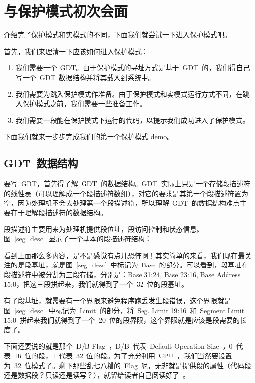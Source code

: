 \section{与保护模式初次会面}

介绍完了保护模式和实模式的不同，下面我们就尝试一下进入保护模式吧。

首先，我们来理清一下应该如何进入保护模式：

\begin{enumerate}
  \item 我们需要一个~GDT。由于保护模式的寻址方式是基于~GDT~的，我们得自己写一个~GDT~数据结构并将其载入到系统中。
  \item 我们需要为跳入保护模式作准备。由于保护模式和实模式运行方式不同，在跳入保护模式之前，我们需要一些准备工作。
  \item 我们需要一段能在保护模式下运行的代码，以提示我们成功进入了保护模式。
\end{enumerate}

下面我们就来一步步完成我们的第一个保护模式 demo。

\subsection{GDT~数据结构}

要写~GDT，首先得了解~GDT~的数据结构。GDT~实际上只是一个存储段描述符的线性表（可以理解成一个段描述符数组），对它的要求是其第一个段描述符置为空，因为处理机不会去处理第一个段描述符，所以理解~GDT~的数据结构难点主要在于理解段描述符的数据结构。

段描述符主要用来为处理机提供段位址，段访问控制和状态信息。图~\ref{seg_desc}~显示了一个基本的段描述符结构：


看到上面那么多内容，是不是感觉有点儿恐怖啊！其实简单的来看，我们现在最关注的是段基址，就是图~\ref{seg_desc}~中标记为~Base~的部分。可以看到，段基址在段描述符中被分割为三段存储，分别是：Base 31:24, Base 23:16, Base Address 15:0，把这三段拼起来，我们就得到了一个~32~位的段基址。

有了段基址，就需要有一个界限来避免程序跑丢发生段错误，这个界限就是图~\ref{seg_desc}~中标记为~Limit~的部分，将~Seg. Limit 19:16~和~Segment Limit 15:0~拼起来我们就得到了一个~20~位的段界限，这个界限就是应该是段需要的长度了。

下面还要说的就是那个~D/B Flag~，D/B~代表~Default Operation Size~，0~代表~16~位的段，1~代表~32~位的段。为了充分利用~CPU~，我们当然要设置为~32~位模式了。剩下那些乱七八糟的~Flag~呢，无非就是提供段的属性（代码段还是数据段？只读还是读写？），就留给读者自己阅读好了~\smiley。

